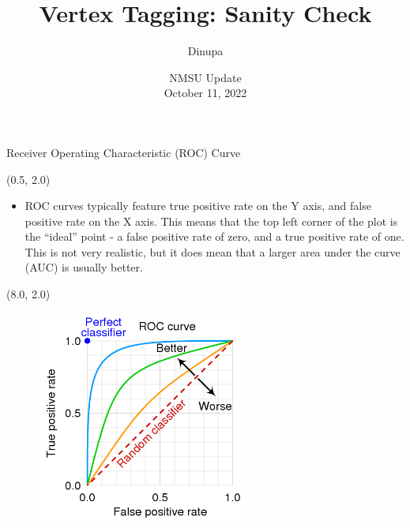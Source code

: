 \documentclass[12pt, xcolor={dvipsnames}, aspectratio = 169]{beamer}
\title{Vertex Tagging: Sanity Check}
\author{Dinupa}
\date{NMSU Update
\\ October 11, 2022 }
\begin{document}
\begin{frame}
    \maketitle
\end{frame}

\begin{frame}[fragile]{Receiver Operating Characteristic (ROC) Curve}

\begin{textblock}{7.0}(0.5, 2.0)
\begin{itemize}

    \item ROC curves typically feature true positive rate on the Y axis, and false positive rate on the X axis. This means that the top left corner of the plot is the “ideal” point - a false positive rate of zero, and a true positive rate of one. This is not very realistic, but it does mean that a larger area under the curve (AUC) is usually better.

\end{itemize}
\end{textblock}

\begin{textblock}{7.0}(8.0, 2.0)
\begin{figure}
    \centering
    \includegraphics[width=7.0cm]{../imgs/Roc_curve.png}
\end{figure}
\end{textblock}

\end{frame}
\end{document}
